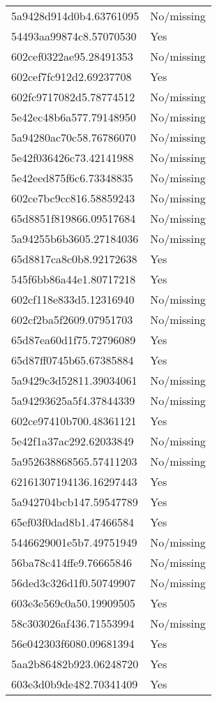 \begin{tabular}{ll}
5a9428d914d0b4.63761095 & No/missing \\
54493aa99874c8.57070530 & Yes \\
602cef0322ae95.28491353 & No/missing \\
602cef7fc912d2.69237708 & Yes \\
602fc9717082d5.78774512 & No/missing \\
5e42ec48b6a577.79148950 & No/missing \\
5a94280ac70c58.76786070 & No/missing \\
5e42f036426c73.42141988 & No/missing \\
5e42eed875f6c6.73348835 & No/missing \\
602ce7bc9cc816.58859243 & No/missing \\
65d8851f819866.09517684 & No/missing \\
5a94255b6b3605.27184036 & No/missing \\
65d8817ca8c0b8.92172638 & Yes \\
545f6bb86a44e1.80717218 & Yes \\
602cf118e833d5.12316940 & No/missing \\
602cf2ba5f2609.07951703 & No/missing \\
65d87ea60d1f75.72796089 & Yes \\
65d87ff0745b65.67385884 & Yes \\
5a9429c3d52811.39034061 & No/missing \\
5a94293625a5f4.37844339 & No/missing \\
602ce97410b700.48361121 & Yes \\
5e42f1a37ac292.62033849 & No/missing \\
5a952638868565.57411203 & No/missing \\
62161307194136.16297443 & Yes \\
5a942704bcb147.59547789 & Yes \\
65ef03f0dad8b1.47466584 & Yes \\
5446629001e5b7.49751949 & No/missing \\
56ba78c414ffe9.76665846 & No/missing \\
56ded3c326d1f0.50749907 & No/missing \\
603e3e569c0a50.19909505 & Yes \\
58c303026af436.71553994 & No/missing \\
56e042303f6080.09681394 & Yes \\
5aa2b86482b923.06248720 & Yes \\
603e3d0b9de482.70341409 & Yes \\

\end{tabular}
